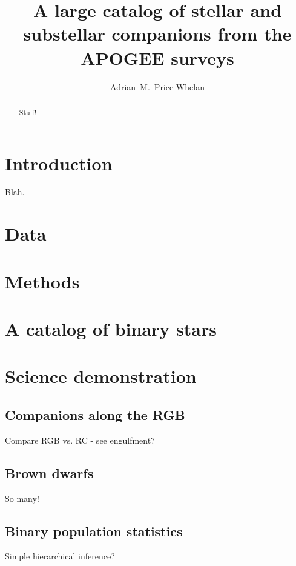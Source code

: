 \documentclass[modern]{aastex62}
\begin{document}
\title{A large catalog of stellar and substellar companions from the APOGEE surveys}

\author[0000-0003-0872-7098]{Adrian~M.~Price-Whelan}


\begin{abstract}
Stuff!
\end{abstract}

\keywords{}


\section{Introduction} \label{sec:intro}

Blah.


\section{Data} \label{sec:data}


\section{Methods} \label{sec:methods}


\section{A catalog of binary stars} \label{sec:catalog}


\section{Science demonstration} \label{sec:science}

\subsection{Companions along the RGB}
Compare RGB vs. RC - see engulfment?

\subsection{Brown dwarfs}
So many!

\subsection{Binary population statistics}
Simple hierarchical inference?
\end{document}
